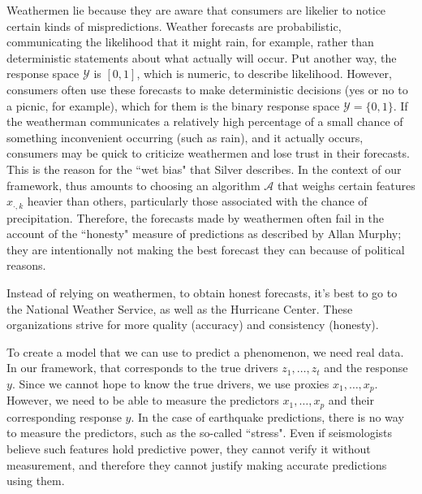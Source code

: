 \documentclass[12pt]{article}
\begin{document}
\begin{enumerate}
Weathermen lie because they are aware that consumers are likelier to notice
certain kinds of mispredictions. Weather forecasts are probabilistic, communicating
the likelihood that it might rain, for example, rather than deterministic statements
about what actually will occur. Put another way, the response space $\mathcal{Y}$
is $[0, 1]$, which is numeric, to describe likelihood. However, consumers often
use these forecasts to make deterministic decisions (yes or no to a picnic, for example),
which for them is the binary response space $\mathcal{Y}=\{0, 1\}$. If
the weatherman communicates a relatively high percentage of a small chance of
something inconvenient occurring (such as rain), and it actually occurs,
consumers may be quick to criticize weathermen and lose trust in their forecasts.
This is the reason for the ``wet bias" that Silver describes. In the context
of our framework, thus amounts to choosing an algorithm $\mathcal{A}$ that weighs
certain features $x_{\cdot, k}$ heavier than others, particularly those
associated with the chance of precipitation. Therefore,
the forecasts made by weathermen often fail in the account of the ``honesty"
measure of predictions as described by Allan Murphy; they are intentionally
not making the best forecast they can because of political reasons.

Instead of relying on weathermen, to obtain honest forecasts, it's best to go to the
National Weather Service, as well as the Hurricane Center. These organizations
strive for more quality (accuracy) and consistency (honesty).



To create a model that we can use to predict a phenomenon, we need real data.
In our framework, that corresponds to the true drivers $z_1,\ldots,z_t$ and
the response $y$. Since we cannot hope to know the true drivers, we use
proxies $x_1,\ldots,x_p$. However, we need to be able to measure the predictors
$x_1,\ldots,x_p$ and their corresponding response $y$. In the case of
earthquake predictions, there is no way to measure the predictors, such
as the so-called ``stress". Even if seismologists believe such features
hold predictive power, they cannot verify it without measurement, and
therefore they cannot justify making accurate predictions using them.


\end{enumerate}
\end{document}
